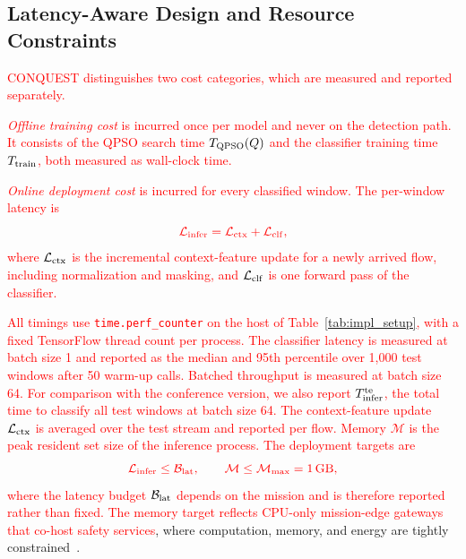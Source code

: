 \documentclass[conference]{IEEEtran}
\begin{document}
\subsection{Latency-Aware Design and Resource Constraints}
\label{subsec:latency_design}
\textcolor{red}{CONQUEST distinguishes two cost
categories, which are measured and reported separately.}

\textcolor{red}{\textit{Offline training cost} is incurred
once per model and never on the detection path. It consists of the
QPSO search time $T_{\rm QPSO}(Q)$ and the classifier training time
$T_{\rm train}$, both measured as wall-clock time.}

\textcolor{red}{\textit{Online deployment cost} is incurred
for every classified window. The per-window latency is}
\begin{equation}
\textcolor{red}{\mathcal{L}_{\rm infer} =
\mathcal{L}_{\rm ctx} + \mathcal{L}_{\rm clf},}
\label{eq:latency_decomp}
\end{equation}
\textcolor{red}{where $\mathcal{L}_{\rm ctx}$ is the
incremental context-feature update for a newly arrived flow,
including normalization and masking, and $\mathcal{L}_{\rm clf}$ is
one forward pass of the classifier.}

\textcolor{red}{All timings use \texttt{time.perf\_counter}
on the host of Table~\ref{tab:impl_setup}, with a fixed TensorFlow
thread count per process. The classifier latency is measured at batch
size 1 and reported as the median and 95th percentile over 1{,}000
test windows after 50 warm-up calls. Batched throughput is measured
at batch size 64. For comparison with the conference version, we also
report $T_{\rm infer}^{\rm te}$, the total time to classify all test
windows at batch size 64. The context-feature update
$\mathcal{L}_{\rm ctx}$ is averaged over the test stream and reported
per flow. Memory $\mathcal{M}$ is the peak resident set size of the
inference process. The deployment targets are}
\begin{equation}
\textcolor{red}{\mathcal{L}_{\rm infer}\le\mathcal{B}_{\rm lat},
\qquad
\mathcal{M}\le\mathcal{M}_{\max}=1\,\text{GB},}
\label{eq:memory_constraint}
\end{equation}
\textcolor{red}{where the latency budget
$\mathcal{B}_{\rm lat}$ depends on the mission and is therefore
reported rather than fixed. The memory target reflects CPU-only
mission-edge gateways that co-host safety services}, where
computation, memory, and energy are tightly
constrained~\cite{amadi2026lightweight}.
\end{document}
